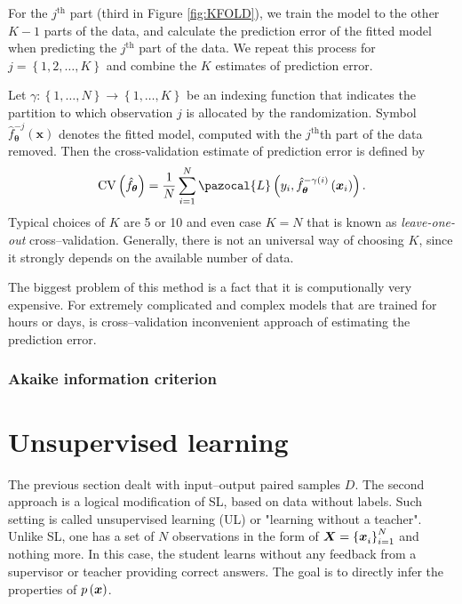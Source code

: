 For the $j^{\mathrm{th}}$ part (third in Figure \ref{fig:KFOLD}), we train the model to the other $K-1$ parts
of the data, and calculate the prediction error of the fitted model when
predicting the $j^{\mathrm{th}}$ part of the data. We repeat this process for $j = \left\lbrace 1,2,\dots,K\right\rbrace$ and
combine the $K$ estimates of prediction error.

Let $\gamma : \left\lbrace 1,\dots,N\right\rbrace\rightarrow  \left\lbrace 1,\dots,K\right\rbrace$ be an indexing
function that indicates the partition to which observation $j$ is allocated by
the randomization. Symbol $\hat{f}_{\boldsymbol{\theta}}^{-j}\left(\boldsymbol{x}\right)$ denotes the fitted model, computed with
the $j^{\mathrm{th}}$th part of the data removed. Then the cross-validation estimate of
prediction error is defined by
\begin{equation}
\mathrm{CV}\left(\hat{f}_{\boldsymbol{\theta}}\right) = \frac{1}{N}\sum_{i = 1}^{N}\pazocal{L}\left(y_i , \hat{f}_{\boldsymbol{\theta}}^{-\gamma\left(i\right)}\left(\boldsymbol{x}_i\right)\right).
\end{equation}
Typical choices of $K$ are 5 or 10 and even case $K = N$ that is known as \emph{leave-one-out} cross--validation. Generally, there is not an universal way of choosing $K$, since it strongly depends on the available number of data. 

The biggest problem of this method is a fact that it is computionally very expensive. For extremely complicated and complex models that are trained for hours or days, is cross--validation inconvenient approach of estimating the prediction error.
\subsubsection{Akaike information criterion}


\section{Unsupervised learning}
The previous section dealt with input--output paired samples $D$. The second approach is a logical modification of SL, based on data without labels. Such setting is called unsupervised learning (UL) or "learning without a teacher". Unlike SL, one has a set of $N$ observations in the form of $\boldsymbol{X} = \left\lbrace \boldsymbol{x}_i^{}\right\rbrace_{i=1}^N$ and nothing more. In this case, the student learns without any feedback from a supervisor or teacher providing correct answers. The goal is to directly infer the properties of $p\left( \boldsymbol{x} \right)$.




